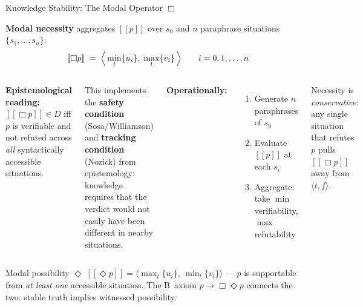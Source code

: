 \documentclass[aspectratio=169,9pt]{beamer}
\newcommand{\tv}[2]{\langle #1,#2 \rangle}
\newcommand{\semp}{[\![p]\!]}
\begin{document}
\begin{frame}{Knowledge Stability: The Modal Operator $\Box$}

  \textbf{Modal necessity} aggregates $\semp$ over $s_0$ and $n$ paraphrase
  situations $\{s_1,\ldots,s_n\}$:
  \[
    [\![\Box p]\!] \;=\;
    \Bigl\langle\,
      \min_t\{u_i\},\;
      \max_t\{v_i\}
    \,\Bigr\rangle
    \qquad
    i = 0, 1, \ldots, n
  \]

  \begin{columns}[T]
    \textbf{Epistemological reading:}\\[4pt]
    $[\![\Box p]\!] \in D$ iff $p$ is verifiable and not refuted across
    \emph{all} syntactically accessible situations.

    \medskip
    This implements the \textbf{safety condition} (Sosa/Williamson) and
    \textbf{tracking condition} (Nozick) from epistemology:
    knowledge requires that the verdict would not easily have been different
    in nearby situations.

    \textbf{Operationally:}
    \begin{enumerate}\setlength\itemsep{3pt}
      \item Generate $n$ paraphrases of $s_0$
      \item Evaluate $\semp$ at each $s_i$
      \item Aggregate: take $\min$ verifiability, $\max$ refutability
    \end{enumerate}

    \medskip\small
    Necessity is \emph{conservative}: any single situation
    that refutes $p$ pulls $[\![\Box p]\!]$ away from $\tv{t}{f}$.
  \end{columns}

  \medskip\pause

  \begin{block}{Modal possibility $\Diamond$}
    \small $[\![\Diamond p]\!] = \langle\max_t\{u_i\},\, \min_t\{v_i\}\rangle$ — $p$ is supportable
    from \emph{at least one} accessible situation.
    The B~axiom $p \to \Box\Diamond p$ connects the two: stable truth implies
    witnessed possibility.
  \end{block}

\end{frame}
\end{document}
